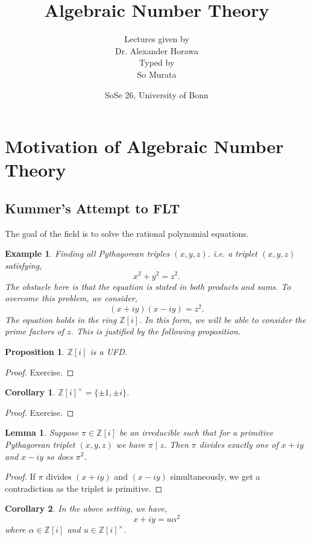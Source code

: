 \documentclass[10pt]{article}
\title{Algebraic Number Theory}
\author{Lectures given by\\Dr. Alexander Horawa\\Typed by\\So Murata}
\date{SoSe 26, University of Bonn}
\newtheorem{proposition}{Proposition}[section]
\newtheorem{lemma}{Lemma}[section]
\newtheorem{corollary}{Corollary} [section]
\newtheorem{example}{Example}[section]
\newcommand{\Z}[0]{\mathbb{Z}}
\begin{document}
\maketitle


\section{Motivation of Algebraic Number Theory}
\subsection{Kummer's Attempt to FLT}
The goal of the field is to solve the rational polynomial equations. 
\begin{example}
    Finding all Pythagorean triples $(x,y,z)$. i.e. a triplet $(x,y,z)$ satisfying,
    \begin{equation*}
    x^2+y^2=z^2.
    \end{equation*}
    The obstacle here is that the equation is stated in both products and sums.
    To overcome this problem, we consider,
    \begin{equation*}
    (x+iy)(x-iy) = z^2.
    \end{equation*}
    The equation holds in the ring $\Z[i]$. In this form, we will be able to consider the prime factors of $z$. This is justified by the following proposition.
\end{example}
\begin{proposition}
    $\Z[i]$ is a UFD.
\end{proposition}
\begin{proof}
    Exercise.
\end{proof}
\begin{corollary}
    $\Z[i]^\times = \{\pm1,\pm i\}$.
\end{corollary}
\begin{proof}
    Exercise.
\end{proof}
\begin{lemma}
    \label{lemma_prime_divisor_z}
    Suppose $\pi\in\Z[i]$ be an irreducible such that for a primitive Pythagorean triplet $(x,y,z)$ we have $\pi\mid z$. Then $\pi$ divides exactly one of $x+iy$ and $x-iy$ so does $\pi^2$.
\end{lemma}
\begin{proof}
    If $\pi$ divides $(x+iy)$ and $(x-iy)$ simultaneously, we get a contradiction as the triplet is primitive.
\end{proof}
\begin{corollary}
    \label{corollary_factor_z_square}
    In the above setting, we have,
    \begin{equation*}
    x+ iy = u\alpha^2
    \end{equation*}
    where $\alpha\in\Z[i]$ and $u\in\Z[i]^\times$.
\end{corollary}
\end{document}
